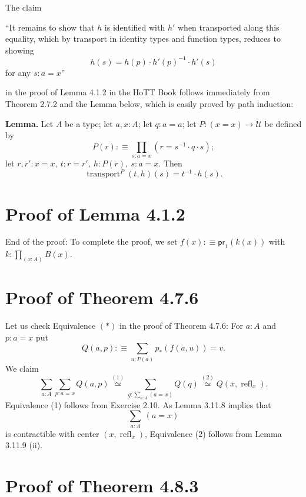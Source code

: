 \documentclass[12pt]{article}
\newcommand{\ee}{\equiv}
\newcommand{\msf}{\mathsf}
\newcommand{\nn}{\noindent}
\newcommand{\oo}{\operatorname}
\newcommand{\U}{\mathcal U}
\begin{document}
The claim

\nn ``It remains to show that $h$ is identified with $h'$ when transported along this equality, which by transport in identity types and function types, reduces to showing 
$$
h(s)=h(p)\cdot h'(p)^{-1}\cdot h'(s)
$$ 
for any $s:a=x$''

\nn in the proof of Lemma 4.1.2 in the HoTT Book follows immediately from Theorem 2.7.2 and the Lemma below, which is easily proved by path induction:

\nn \textbf{Lemma.} Let $A$ be a type; let $a,x:A$; let $q:a=a$; let $P:(x=x)\to\U$ be defined by 
$$
P(r):\equiv\prod_{s:a=x}(r=s^{-1}\cdot q\cdot s);
$$ 
let $r,r':x=x,\ t:r=r',\ h:P(r),\ s:a=x$. Then 
$$
\oo{transport}^P(t,h)(s)=t^{-1}\cdot h(s).
$$ 


\section{Proof of Lemma 4.1.2}

End of the proof: To complete the proof, we set $f(x):\ee\msf{pr}_1(k(x))$ with $k:\prod_{(x:A)}B(x)$.





\section{Proof of Theorem 4.7.6}

Let us check Equivalence $(*)$ in the proof of Theorem 4.7.6: For $a:A$ and $p:a=x$ put 
$$
Q(a,p):\equiv\sum_{u:P(a)}p_*(f(a,u))=v.
$$ 
We claim 
$$
\sum_{a:A}\sum_{p:a=x}Q(a,p)\overset{(1)}{\simeq}
\sum_{q:\sum_{a:A}(a=x)}Q(q)\overset{(2)}{\simeq}
Q(x,\oo{refl}_x).
$$
Equivalence (1) follows from Exercise 2.10. As Lemma 3.11.8 implies that $$\sum_{a:A}\ (a=x)$$ is contractible with center $(x,\oo{refl}_x)$, Equivalence (2) follows from Lemma 3.11.9 (ii). 


\section{Proof of Theorem 4.8.3}
\end{document}
